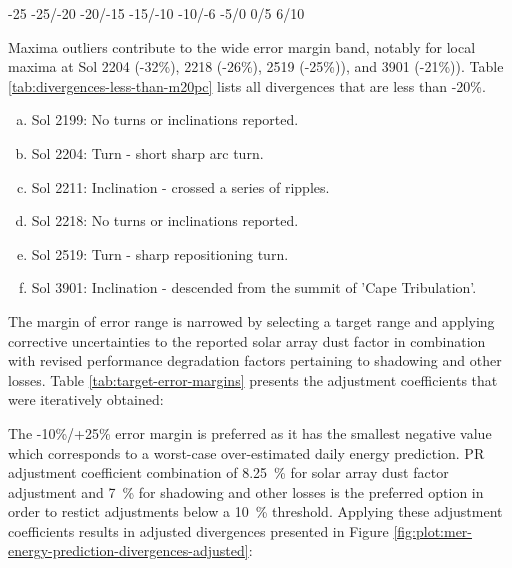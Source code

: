 
-25
-25/-20
-20/-15
-15/-10
-10/-6
-5/0
0/5
6/10


Maxima outliers contribute to the wide error margin band, notably for local maxima at Sol 2204 (-32\%), 2218 (-26\%), 2519 (-25\%)), and 3901 (-21\%)). Table \ref{tab:divergences-less-than-m20pc} lists all divergences that are less than -20\%.



\begin{enumerate}[(a)]
  \item Sol 2199: No turns or inclinations reported.
  \item Sol 2204: Turn - short sharp arc turn.
  \item Sol 2211: Inclination - crossed a series of ripples.
  \item Sol 2218: No turns or inclinations reported.
  \item Sol 2519: Turn - sharp repositioning turn.
  \item Sol 3901: Inclination - descended from the summit of 'Cape Tribulation'.
\end{enumerate}




The margin of error range is narrowed by selecting a target range and applying corrective uncertainties to the reported solar array dust factor in combination with revised performance degradation factors pertaining to shadowing and other losses. Table \ref{tab:target-error-margins} presents the adjustment coefficients that were iteratively obtained:




The -10\%/+25\% error margin is preferred as it has the smallest negative value which corresponds to a worst-case over-estimated daily energy prediction. PR adjustment coefficient combination of \SI{8.25}{\percent} for solar array dust factor adjustment and \SI{7}{\percent} for shadowing and other losses is the preferred option in order to restict adjustments below a \SI{10}{\percent} threshold. Applying these adjustment coefficients results in adjusted divergences presented in Figure \ref{fig:plot:mer-energy-prediction-divergences-adjusted}:

